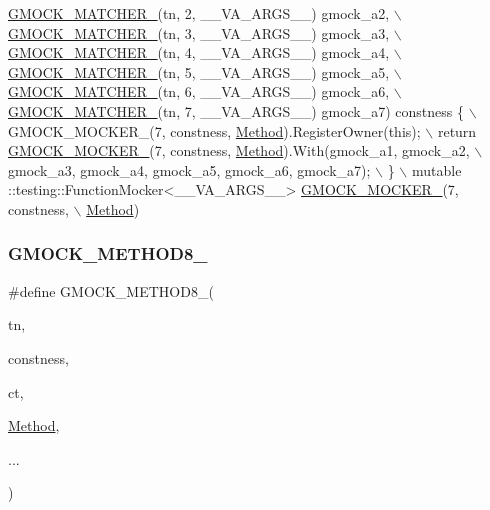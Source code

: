 \begin{DoxyCode}
                     \hyperlink{gmock-generated-function-mockers_8h_aa87d0009fe91f1c89d658776b55a769c}{GMOCK\_MATCHER\_}(tn, 2, \_\_VA\_ARGS\_\_) gmock\_a2, \(\backslash\)
                     \hyperlink{gmock-generated-function-mockers_8h_aa87d0009fe91f1c89d658776b55a769c}{GMOCK\_MATCHER\_}(tn, 3, \_\_VA\_ARGS\_\_) gmock\_a3, \(\backslash\)
                     \hyperlink{gmock-generated-function-mockers_8h_aa87d0009fe91f1c89d658776b55a769c}{GMOCK\_MATCHER\_}(tn, 4, \_\_VA\_ARGS\_\_) gmock\_a4, \(\backslash\)
                     \hyperlink{gmock-generated-function-mockers_8h_aa87d0009fe91f1c89d658776b55a769c}{GMOCK\_MATCHER\_}(tn, 5, \_\_VA\_ARGS\_\_) gmock\_a5, \(\backslash\)
                     \hyperlink{gmock-generated-function-mockers_8h_aa87d0009fe91f1c89d658776b55a769c}{GMOCK\_MATCHER\_}(tn, 6, \_\_VA\_ARGS\_\_) gmock\_a6, \(\backslash\)
                     \hyperlink{gmock-generated-function-mockers_8h_aa87d0009fe91f1c89d658776b55a769c}{GMOCK\_MATCHER\_}(tn, 7, \_\_VA\_ARGS\_\_) gmock\_a7) constness \{ \(\backslash\)
    GMOCK\_MOCKER\_(7, constness, \hyperlink{gmock-spec-builders__test_8cc_a95606368148f3e5aab5db46c32466afd}{Method}).RegisterOwner(\textcolor{keyword}{this}); \(\backslash\)
    return \hyperlink{gmock-generated-function-mockers_8h_a7d362499e27b1bc3a9806dd3cf58a5b7}{GMOCK\_MOCKER\_}(7, constness, \hyperlink{gmock-spec-builders__test_8cc_a95606368148f3e5aab5db46c32466afd}{Method}).With(gmock\_a1, gmock\_a2, \(\backslash\)
        gmock\_a3, gmock\_a4, gmock\_a5, gmock\_a6, gmock\_a7); \(\backslash\)
  \} \(\backslash\)
  mutable ::testing::FunctionMocker<\_\_VA\_ARGS\_\_> \hyperlink{gmock-generated-function-mockers_8h_a7d362499e27b1bc3a9806dd3cf58a5b7}{GMOCK\_MOCKER\_}(7, constness, \(\backslash\)
      \hyperlink{gmock-spec-builders__test_8cc_a95606368148f3e5aab5db46c32466afd}{Method})
\end{DoxyCode}
\mbox{\label{gmock-generated-function-mockers_8h_aa84a36427c44505207b7cad5dec7ad67}} 
\subsubsection{\texorpdfstring{G\+M\+O\+C\+K\+\_\+\+M\+E\+T\+H\+O\+D8\+\_\+}{GMOCK\_METHOD8\_}}
{\footnotesize\ttfamily \#define G\+M\+O\+C\+K\+\_\+\+M\+E\+T\+H\+O\+D8\+\_\+(\begin{DoxyParamCaption}\item[{}]{tn,  }\item[{}]{constness,  }\item[{}]{ct,  }\item[{}]{\hyperlink{gmock-spec-builders__test_8cc_a95606368148f3e5aab5db46c32466afd}{Method},  }\item[{}]{... }\end{DoxyParamCaption})}

